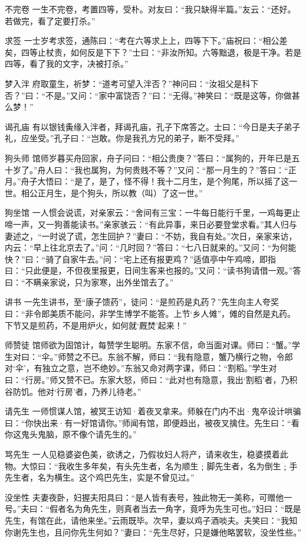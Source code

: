 \documentclass[12pt,UTF8]{ctexbook}
\begin{document}
不完卷
一生不完卷，考置四等，受朴。对友曰：“我只缺得半篇。”友云：“还好。若做完，看了定要打杀。”

求签
一士岁考求签，通陈曰：“考在六等求上上，四等下下。”庙祝曰：“相公差矣，四等止杖责，如何反是下下？”士曰：“非汝所知。六等黜退，极是干净。若是四等，看了我的文字，决被打杀。”

梦入泮
府取童生，祈梦：“道考可望入泮否？”神问曰：“汝祖父是科下否？”曰：“不是。”又问：“家中富饶否？”曰：“无得。”神笑曰：“既是这等，你做甚么梦！”

谒孔庙
有以银钱夤缘入泮者，拜谒孔庙，孔子下席答之。士曰：“今日是夫子弟子礼，应坐受。”孔子曰：“岂敢。你是我孔方兄的弟子，断不受拜。”

狗头师
馆师岁暮买舟回家，舟子问曰：“相公贵庚？”答曰：“属狗的，开年已是五十岁了。”舟人曰：“我也属狗，为何贵贱不等？”又问：“那一月生的？”答曰：“正月。”舟子大悟曰：“是了，是了，怪不得！我十二月生，是个狗尾，所以摇了这一世。相公正月生，是个狗头，所以教（叫）了这一世。”

狗坐馆
一人惯会说谎，对亲家云：“舍间有三宝：一牛每日能行千里，一鸡每更止啼一声，又一狗善能读书。”亲家骇云：“有此异事，来日必要登堂求看。”其人归与妻述之，“一时说了谎，怎生回护？”妻曰：“不妨，我自有处。”次日，亲家来访，内云：“早上往北京去了。”问：“几时回？”答曰：“七八日就来的。”又问：“为何能快？”曰：“骑了自家牛去。”问：“宅上还有报更鸡？”适值亭中午鸡啼，即指曰：“只此便是，不但夜里报更，日间生客来也报的。”又问：“读书狗请借一观。”答曰：“不瞒亲家说，只为家寒，出外坐馆去了。”

讲书
一先生讲书，至“康子馈药”，徒问：“是煎药是丸药？”先生向主人夸奖曰：“非令郎美质不能问，非学生博学不能答。上节‘乡人傩”，傩的自然是丸药。下节又是煎药，不是用炉火，如何就‘厩焚’起来！”

师赞徒
馆师欲为固馆计，每赞学生聪明。东家不信，命当面对课。师曰：“蟹。”学生对曰：“伞。”师赞之不已。东翁不解，师曰：“我有隐意，蟹乃横行之物，令郎对‘伞’，有独立之意，岂不绝妙。”东翁又命对两字课，师曰：“割稻。”学生对曰：“行房。”师又赞不已。东家大怒，师曰：“此对也有隐意，我出‘割稻’者，乃积谷防饥。他对‘行房’者，乃养儿待老。”

请先生
一师惯谋人馆，被冥王访知·着夜叉拿来。师躲在门内不出·鬼卒设计哄骗曰：“你快出来·有一好馆请你。”师闻有馆，即便趋出，被夜叉擒住。先生曰：“看你这鬼头鬼脑，原不像个请先生的。”

骂先生
一人见稳婆姿色美，欲诱之，乃假妆妇人将产，请来收生，稳婆摸着此物。大惊曰：“我收生多年矣，有头先生者，名为顺生﹔脚先生者，名为倒生﹔手先生者，名为横生。这个鸡巴先生，实是不曾见过。”

没坐性
夫妻夜卧，妇握夫阳具曰：“是人皆有表号，独此物无一美称，可赠他一号。”夫曰：“假者名为角先生，则真者当去一角字，竟呼为先生可也。”妇曰：“既是先生，有馆在此，请他来坐。”云雨既毕。次早，妻以鸡子酒啖夫。夫笑曰：“我知你谢先生也，且问你先生何如？”妻曰：“先生尽好，只是嫌他略罢软，没坐性些。”
\end{document}
